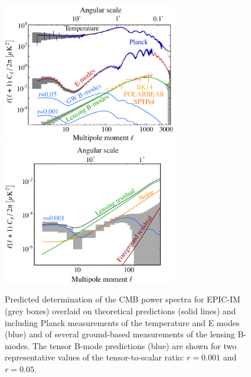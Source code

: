 \begin{figure}[ht!]
\begin{center}
\includegraphics[width=3in]{figs/cmb_powspec_v1.pdf}  
\includegraphics[width=3in]{figs/cmbbb_powspec_v1.pdf}
\end{center}
\vspace{-0.25in}
\caption{ \small \setlength{\baselineskip}{0.95\baselineskip}
Predicted determination of the \ac{CMB} power spectra for EPIC-IM (grey boxes) overlaid
on theoretical predictions (solid lines) and including Planck measurements of the 
temperature and E modes (blue) and of several ground-based measurements 
of the lensing B-modes.  The tensor B-mode predictions (blue) are shown 
for two representative values of the tensor-to-scalar
ratio: $r=0.001$ and $r=0.05.$ 
\label{fig:clall} }
\vspace{-0.05in}
\end{figure}


